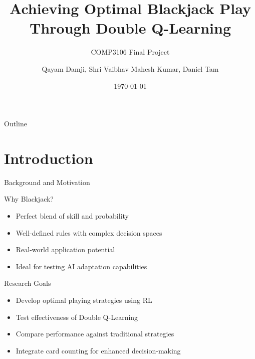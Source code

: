\documentclass{beamer}
\title{Achieving Optimal Blackjack Play Through Double Q-Learning}
\subtitle{COMP3106 Final Project}
\author{Qayam Damji, Shri Vaibhav Mahesh Kumar, Daniel Tam}
\institute{Carleton University}
\date{\today}
\begin{document}
\begin{frame}
    \titlepage
\end{frame}

\begin{frame}{Outline}
    \tableofcontents[hideallsubsections]
\end{frame}

\section{Introduction}

\begin{frame}{Background and Motivation}
    \begin{block}{Why Blackjack?}
        \begin{itemize}
            \item Perfect blend of skill and probability
            \item Well-defined rules with complex decision spaces
            \item Real-world application potential
            \item Ideal for testing AI adaptation capabilities
        \end{itemize}
    \end{block}
    
    \begin{block}{Research Goals}
        \begin{itemize}
            \item Develop optimal playing strategies using RL
            \item Test effectiveness of Double Q-Learning
            \item Compare performance against traditional strategies
            \item Integrate card counting for enhanced decision-making
        \end{itemize}
    \end{block}
\end{frame}
\end{document}
